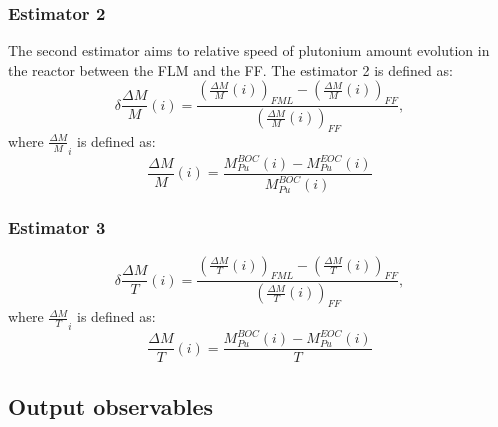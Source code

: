 \subsubsection{Estimator 2}
The second estimator aims to relative speed of plutonium amount evolution in the
reactor between the \gls{FLM} and the \gls{FF}. The estimator 2 is defined as:
\begin{equation}
    \delta{\frac{\Delta M}{M}}(i) =
        \frac{\left(\frac{\Delta M}{M}(i)\right)_{FML}
              - \left(\frac{\Delta M}{M}(i)\right)_{FF}}
             {\left(\frac{\Delta M}{M}(i)\right)_{FF}},
\end{equation}
where $\frac{\Delta M}{M}_{i}$ is defined as:
\begin{equation}
    \frac{\Delta M}{M}(i) = \frac{M_{Pu}^{BOC}(i) -
    M_{Pu}^{EOC}(i)}{M_{Pu}^{BOC}(i)}
\end{equation}


\subsubsection{Estimator 3}


\begin{equation}
    \delta{\frac{\Delta M}{T}}(i) =
        \frac{\left(\frac{\Delta M}{T}(i)\right)_{FML}
              - \left(\frac{\Delta M}{T}(i)\right)_{FF}}
             {\left(\frac{\Delta M}{T}(i)\right)_{FF}},
\end{equation}
where $\frac{\Delta M}{T}_{i}$ is defined as:
\begin{equation}
    \frac{\Delta M}{T}(i) = \frac{M_{Pu}^{BOC}(i) -
    M_{Pu}^{EOC}(i)}{T}
\end{equation}

\subsection{Output observables}


